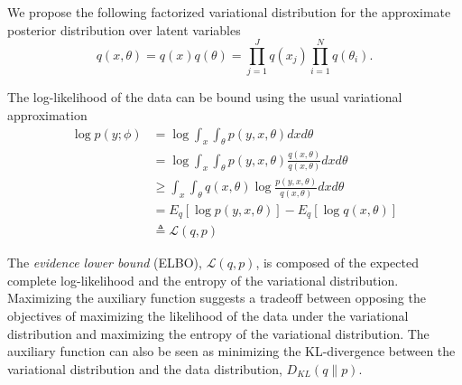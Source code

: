 \documentclass[11pt]{amsart}
\begin{document}
We propose the following factorized variational distribution for the approximate posterior distribution over latent variables
\begin{equation}
	q(x, \theta) = q(x)q(\theta) = \prod_{j=1}^J q(x_{j}) \prod_{i=1}^N q(\theta_i).
\end{equation}

%

The log-likelihood of the data can be bound using the usual variational approximation
\begin{equation}
\begin{split}
\log p(y ; \phi)   &= \log \int_x \int_\theta p(y,x,\theta) dx d\theta \\
&= \log \int_x \int_\theta p(y,x,\theta) \frac{ q(x,\theta) } { q(x,\theta) } dx d\theta \\
&\geq \int_x \int_\theta q(x, \theta) \log \frac{ p(y,x,\theta) } { q(x,\theta) } dx d\theta \\
&= E_q \left[ \log p(y, x, \theta) \right] - E_q \left[ \log q(x, \theta) \right] \\
&\triangleq \mathcal{L}(q, p)
\end{split}
\end{equation}

The \emph{evidence lower bound} (ELBO),  $\mathcal{L}(q, p)$, is composed of the expected complete log-likelihood and the entropy of the variational distribution. Maximizing the auxiliary function suggests a tradeoff between opposing the objectives of maximizing the likelihood of the data under the variational distribution and maximizing the entropy of the variational distribution. The auxiliary function can also be seen as minimizing the KL-divergence between the variational distribution and the data distribution, $D_{KL}(q\|p)$.
\end{document}
